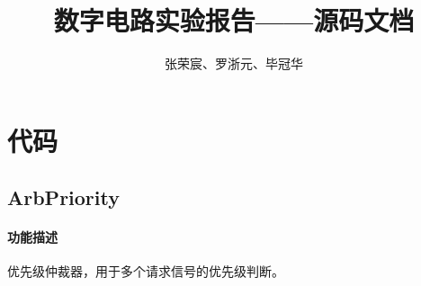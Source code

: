 \documentclass[a4paper]{article}
\begin{document}
\title{数字电路实验报告——源码文档}
\author{张荣宸、罗浙元、毕冠华}
\date{}

\maketitle
\tableofcontents
\newpage


\section{代码}
\subsection{ArbPriority}
\paragraph{功能描述} 优先级仲裁器，用于多个请求信号的优先级判断。
\end{document}
